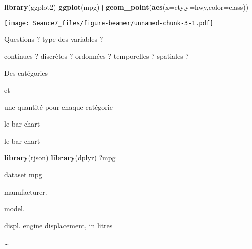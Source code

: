 \documentclass[ignorenonframetext,]{beamer}
\newenvironment{Shaded}{\begin{snugshade}}{\end{snugshade}}
\newcommand{\DataTypeTok}[1]{\textcolor[rgb]{0.13,0.29,0.53}{#1}}
\newcommand{\KeywordTok}[1]{\textcolor[rgb]{0.13,0.29,0.53}{\textbf{#1}}}
\newcommand{\NormalTok}[1]{#1}
\newcommand{\OperatorTok}[1]{\textcolor[rgb]{0.81,0.36,0.00}{\textbf{#1}}}
\begin{document}
\begin{frame}{}
\protect\hypertarget{section-3}{}

\end{frame}

\begin{frame}[fragile]{}
\protect\hypertarget{section-4}{}

\begin{Shaded}
\begin{Highlighting}[]
\KeywordTok{library}\NormalTok{(ggplot2)}
\KeywordTok{ggplot}\NormalTok{(mpg)}\OperatorTok{+}\KeywordTok{geom_point}\NormalTok{(}\KeywordTok{aes}\NormalTok{(}\DataTypeTok{x=}\NormalTok{cty,}\DataTypeTok{y=}\NormalTok{hwy,}\DataTypeTok{color=}\NormalTok{class))}
\end{Highlighting}
\end{Shaded}

\texttt{[image: Seance7\_files/figure-beamer/unnamed-chunk-3-1.pdf]}

\end{frame}

\begin{frame}{}
\protect\hypertarget{section-5}{}

Questions ? type des variables ?

{continues ?} {discrètes ?} {ordonnées ?} {temporelles ?} {spatiales ?}

\end{frame}

\begin{frame}{}
\protect\hypertarget{section-6}{}

{Des catégories}

et

{ une quantité pour chaque catégorie}

\end{frame}

\begin{frame}{}
\protect\hypertarget{section-7}{}

le bar chart

\end{frame}

\begin{frame}[fragile]{{ le bar chart}}
\protect\hypertarget{le-bar-chart}{}

\begin{Shaded}
\begin{Highlighting}[]
\KeywordTok{library}\NormalTok{(rjson)}
\KeywordTok{library}\NormalTok{(dplyr)}
\NormalTok{?mpg}
\end{Highlighting}
\end{Shaded}

dataset mpg

manufacturer.

model.

displ. engine displacement, in litres

\ldots{}

\end{frame}
\end{document}
